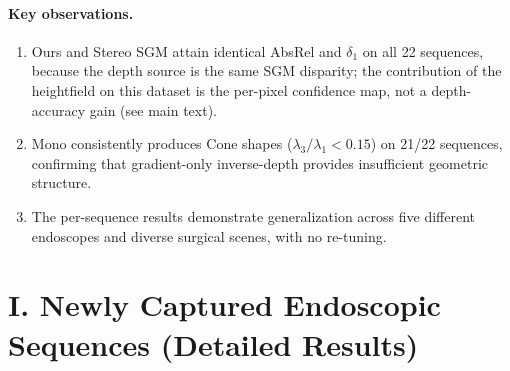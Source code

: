 \documentclass[review]{elsarticle}
\begin{document}
\begin{table}[h]
\end{table}

\paragraph{Key observations.}
\begin{enumerate}[noitemsep]
    \item Ours and Stereo SGM attain identical AbsRel and $\delta_1$ on all 22 sequences, because the depth source is the same SGM disparity; the contribution of the heightfield on this dataset is the per-pixel confidence map, not a depth-accuracy gain (see main text).
    \item Mono consistently produces Cone shapes ($\lambda_3/\lambda_1 < 0.15$) on 21/22 sequences, confirming that gradient-only inverse-depth provides insufficient geometric structure.
    \item The per-sequence results demonstrate generalization across five different endoscopes and diverse surgical scenes, with no re-tuning.
\end{enumerate}

\section*{I. Newly Captured Endoscopic Sequences (Detailed Results)}
\end{document}

